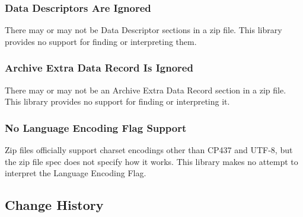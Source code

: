 \subsubsection*{Data Descriptors Are Ignored}

There may or may not be Data Descriptor sections in a zip file. This library provides no support for finding or interpreting them.

\subsubsection*{Archive Extra Data Record Is Ignored}

There may or may not be an Archive Extra Data Record section in a zip file. This library provides no support for finding or interpreting it.

\subsubsection*{No Language Encoding Flag Support}

Zip files officially support charset encodings other than C\+P437 and U\+T\+F-\/8, but the zip file spec does not specify how it works. This library makes no attempt to interpret the Language Encoding Flag.

\subsection*{Change History}


